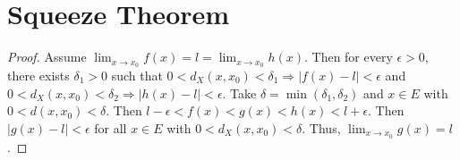 \documentclass{report}
\begin{document}
\section{Squeeze Theorem}
\begin{proof}
    Assume $\lim_{x \to x_0}f(x) = l = \lim_{x \to x_0} h(x)$. Then for every $\epsilon > 0$, there exists $\delta_1 > 0$ such that $0 < d_X(x, x_0) < \delta_1 \Rightarrow |f(x) - l| < \epsilon$ and $0 < d_X(x, x_0) < \delta_2 \Rightarrow |h(x) - l| < \epsilon$. Take $\delta = \min (\delta_1, \delta_2)$ and $x \in E$ with $ 0 < d(x, x_0) < \delta$. Then $l - \epsilon < f(x) < g(x) < h(x) < l + \epsilon$. Then $|g(x) - l| < \epsilon$ for all $x \in E$ with $0 < d_X(x, x_0) < \delta$. Thus, $\lim_{x \to x_0} g(x) = l$.
\end{proof}
\end{document}

